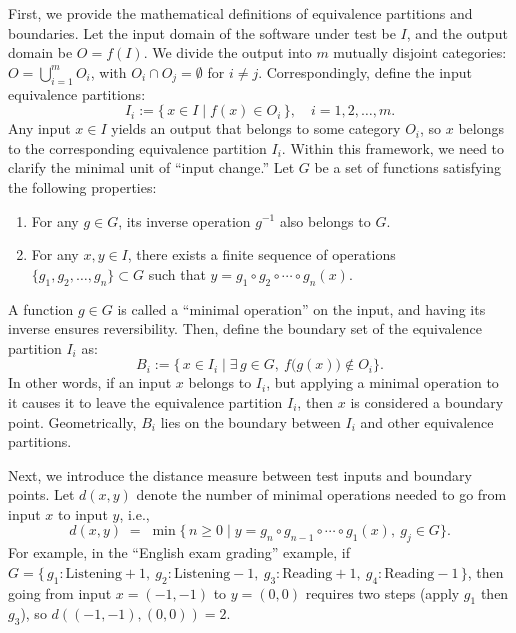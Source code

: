 \documentclass[manuscript,screen,review]{acmart}
\begin{document}
First, we provide the mathematical definitions of equivalence partitions and boundaries. Let the input domain of the software under test be $I$, and the output domain be $O = f(I)$. We divide the output into $m$ mutually disjoint categories: $O = \bigcup_{i=1}^m O_i$, with $O_i \cap O_j = \emptyset$ for $i \neq j$. Correspondingly, define the input equivalence partitions:
\begin{equation}
I_i := \{\, x \in I \mid f(x) \in O_i \,\}, \quad i = 1,2,\ldots,m. \tag{1}
\end{equation}
Any input $x \in I$ yields an output that belongs to some category $O_i$, so $x$ belongs to the corresponding equivalence partition $I_i$. Within this framework, we need to clarify the minimal unit of ``input change.'' Let $G$ be a set of functions satisfying the following properties:
\begin{enumerate}
  \item For any $g \in G$, its inverse operation $g^{-1}$ also belongs to $G$.
  \item For any $x,y \in I$, there exists a finite sequence of operations $\{g_1, g_2, \ldots, g_n\} \subset G$ such that $y = g_1 \circ g_2 \circ \cdots \circ g_n(x)$.
\end{enumerate}
A function $g \in G$ is called a ``minimal operation'' on the input, and having its inverse ensures reversibility. Then, define the boundary set of the equivalence partition $I_i$ as:
\begin{equation}
B_i := \bigl\{\, x \in I_i \mid \exists\, g \in G,\ f\bigl(g(x)\bigr) \notin O_i \bigr\}. \tag{2}
\end{equation}
In other words, if an input $x$ belongs to $I_i$, but applying a minimal operation to it causes it to leave the equivalence partition $I_i$, then $x$ is considered a boundary point. Geometrically, $B_i$ lies on the boundary between $I_i$ and other equivalence partitions.

Next, we introduce the distance measure between test inputs and boundary points. Let $d(x,y)$ denote the number of minimal operations needed to go from input $x$ to input $y$, i.e.,
\begin{equation}
d(x,y) \;=\; \min\bigl\{\, n \ge 0 \mid y = g_n \circ g_{n-1} \circ \cdots \circ g_1(x),\ g_j \in G \bigr\}. \tag{3}
\end{equation}
For example, in the ``English exam grading'' example, if $G = \{\, g_1:\text{Listening}+1,\ g_2:\text{Listening}-1,\ g_3:\text{Reading}+1,\ g_4:\text{Reading}-1 \,\}$, then going from input $x = (-1,-1)$ to $y=(0,0)$ requires two steps (apply $g_1$ then $g_3$), so $d((-1,-1),(0,0)) = 2$.
\end{document}
